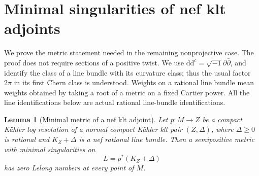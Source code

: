 \documentclass[11pt,letterpaper]{article}
\newcommand{\ii}{\sqrt{-1}}
\newcommand{\ddc}{\mathrm{d}\mathrm{d}^{c}}
\newtheorem{lemma}[theorem]{Lemma}
\theoremstyle{definition}
\theoremstyle{remark}
\begin{document}
\section{Minimal singularities of nef klt adjoints}
\label{met:section}

We prove the metric statement needed in the remaining nonprojective
case.  The proof does not require sections of a positive twist.  We use
\(\ddc=\ii\partial\bar\partial\), and identify the class of a line bundle
with its curvature class; thus the usual factor \(2\pi\) in its first
Chern class is understood.  Weights on a rational line bundle mean
weights obtained by taking a root of a metric on a fixed Cartier power.
All the line identifications below are actual rational line-bundle
identifications.

\begin{lemma}[Minimal metric of a nef klt adjoint]
\label{met:zero-lelong}
Let \(p\colon M\to Z\) be a compact K\"ahler log resolution of a normal
compact K\"ahler klt pair \((Z,\Delta)\), where \(\Delta\geq0\) is rational
and \(K_Z+\Delta\) is a nef rational line bundle.  Then a semipositive
metric with minimal singularities on
\[
 L=p^*(K_Z+\Delta)
\]
has zero Lelong numbers at every point of \(M\).
\end{lemma}
\end{document}

